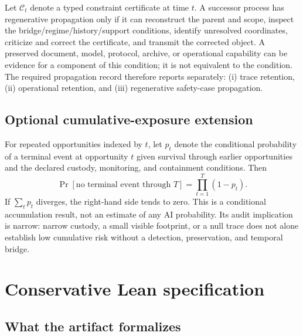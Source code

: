 \documentclass[10pt]{article}
\begin{document}
Let $\mathcal{C}_t$ denote a typed constraint certificate at time $t$. A successor process has regenerative propagation only if it can reconstruct the parent and scope, inspect the bridge/regime/history/support conditions, identify unresolved coordinates, criticize and correct the certificate, and transmit the corrected object. A preserved document, model, protocol, archive, or operational capability can be evidence for a component of this condition; it is not equivalent to the condition. The required propagation record therefore reports separately: (i) trace retention, (ii) operational retention, and (iii) regenerative safety-case propagation.

\subsection{Optional cumulative-exposure extension}

For repeated opportunities indexed by $t$, let $p_t$ denote the conditional probability of a terminal event at opportunity $t$ given survival through earlier opportunities and the declared custody, monitoring, and containment conditions. Then
\begin{equation}
\Pr[\text{no terminal event through }T]=\prod_{t=1}^{T}(1-p_t).
\label{eq:cumulative-exposure}
\end{equation}
If $\sum_t p_t$ diverges, the right-hand side tends to zero. This is a conditional accumulation result, not an estimate of any AI probability. Its audit implication is narrow: narrow custody, a small visible footprint, or a null trace does not alone establish low cumulative risk without a detection, preservation, and temporal bridge.

\section{Conservative Lean specification}
\label{sec:lean}

\subsection{What the artifact formalizes}
\end{document}
